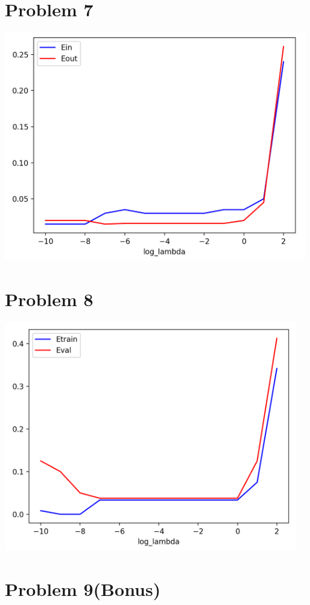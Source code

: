 \documentclass[12pt, a4paper]{article}
\begin{document}
\begin{CJK}{UTF8}{bkai}
	\section*{Problem 7}
		\includegraphics[height=10cm, keepaspectratio=true]{7.png}

	\section*{Problem 8}
		\includegraphics[height=10cm, keepaspectratio=true]{8.png}

	\newpage
	\section*{Problem 9(Bonus)}

\end{CJK}
\end{document}
